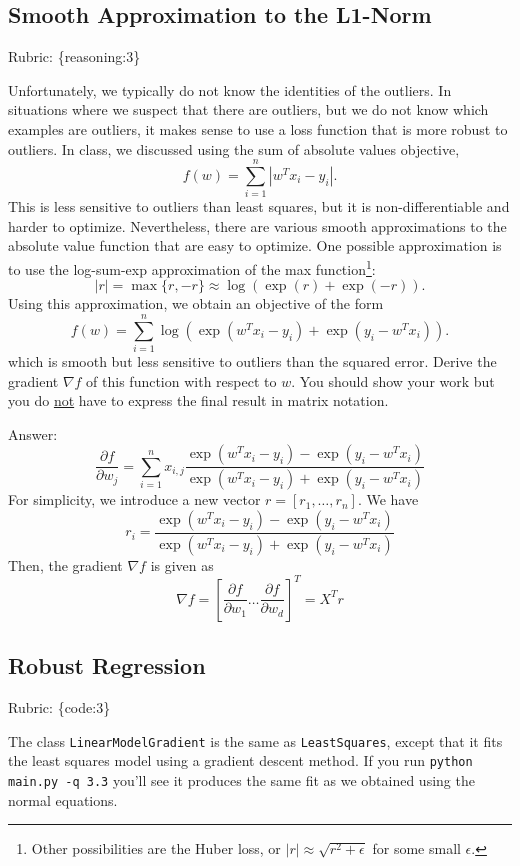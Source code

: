 \documentclass{article}
\def\rubric#1{\gre{Rubric: \{#1\}}}{}
\def\blu#1{{\color{blu}#1}}
\def\gre#1{{\color{gre}#1}}
\begin{document}
\subsection{Smooth Approximation to the L1-Norm}
\rubric{reasoning:3}

Unfortunately, we typically do not know the identities of the outliers. In situations where we suspect that there are outliers, but we do not know which examples are outliers, it makes sense to use a loss function that is more robust to outliers. In class, we discussed using the sum of absolute values objective,
\[
f(w) = \sum_{i=1}^n |w^Tx_i - y_i|.
\]
This is less sensitive to outliers than least squares, but it is non-differentiable and harder to optimize. Nevertheless, there are various smooth approximations to the absolute value function that are easy to optimize. One possible approximation is to use the log-sum-exp approximation of the max function\footnote{Other possibilities are the Huber loss, or $|r|\approx \sqrt{r^2+\epsilon}$ for some small $\epsilon$.}:
\[
|r| = \max\{r, -r\} \approx \log(\exp(r) + \exp(-r)).
\]
Using this approximation, we obtain an objective of the form
\[
f(w) {=} \sum_{i=1}^n  \log\left(\exp(w^Tx_i - y_i) + \exp(y_i - w^Tx_i)\right).
\]
which is smooth but less sensitive to outliers than the squared error. \blu{Derive
 the gradient $\nabla f$ of this function with respect to $w$. You should show your work but you do \underline{not} have to express the final result in matrix notation.}

\gre{Answer:
\begin{equation}
\frac{\partial f}{\partial w_j} = \sum_{i=1}^nx_{i,j}\frac{\exp(w^Tx_i-y_i)-\exp(y_i-w^Tx_i)}{\exp(w^Tx_i-y_i)+\exp(y_i-w^Tx_i)}
\end{equation}
For simplicity, we introduce a new vector $r = [r_1, \ldots, r_n]$.
We have
\begin{equation}
    r_i = \frac{\exp(w^Tx_i-y_i)-\exp(y_i-w^Tx_i)}{\exp(w^Tx_i-y_i)+\exp(y_i-w^Tx_i)}
\end{equation}
Then, the gradient $\nabla f$ is given as
\begin{equation}
    \nabla f = [\frac{\partial f}{\partial w_1} \ldots \frac{\partial f}{\partial w_d}]^T = X^Tr
\end{equation}
}
\subsection{Robust Regression}
\rubric{code:3}

The class \texttt{LinearModelGradient} is the same as \texttt{LeastSquares}, except that it fits the least squares model using a gradient descent method. If you run \verb|python main.py -q 3.3| you'll see it produces the same fit as we obtained using the normal equations.
\end{document}
